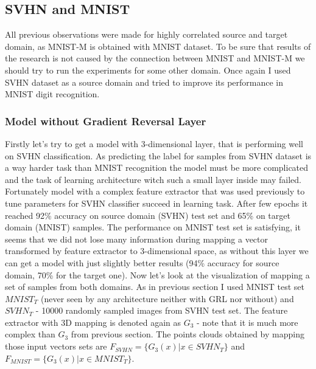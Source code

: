 \documentclass{article}
\begin{document}
\subsection{SVHN and MNIST}
\par
All previous observations were made for highly correlated source and target domain, as MNIST-M is obtained with MNIST dataset. To be sure that results of the research is not caused by the connection between MNIST and MNIST-M we should try to run the experiments for some other domain. Once again I used SVHN dataset as a source domain and tried to improve its performance in MNIST digit recognition. 
\subsubsection{Model without Gradient Reversal Layer}
\par
Firstly let's try to get a model with 3-dimensional layer, that is performing well on SVHN classification. As predicting the label for samples from SVHN dataset is a way harder task than MNIST recognition the model must be more complicated and the task of learning architecture witch such a small layer inside may failed. Fortunately model with a complex feature extractor that was used previously to tune parameters for SVHN classifier succeed in learning task. After few epochs it reached 92\% accuracy on source domain (SVHN) test set and 65\% on target domain (MNIST) samples. The performance on MNIST test set is satisfying, it seems that we did not lose many information during mapping a vector transformed by feature extractor to 3-dimensional space, as without this layer we can get a model with just slightly better results (94\% accuracy for source domain, 70\% for the target one). Now let's look at the visualization of mapping a set of samples from both domains. As in previous section I used MNIST test set $MNIST_{T}$ (never seen by any architecture neither with GRL nor without) and $SVHN_{T}$ - 10000 randomly sampled images from SVHN test set. The feature extractor with 3D mapping is denoted again as $G_{3}$ - note that it is much more complex than $G_{3}$ from previous section. The points clouds obtained by mapping those input vectors sets are $F_{SVHN} = \{ G_{3}(x) | x \in SVHN_{T} \}$  and $F_{MNIST} = \{ G_{3}(x) | x \in MNIST_{T} \}$.   
\end{document}
